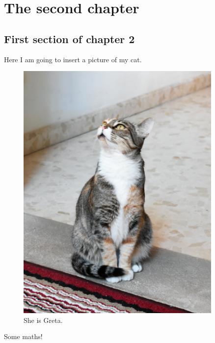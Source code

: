 \chapter{The second chapter}\label{chap2}
{
\hypersetup{linkcolor=\linkColor}
\minitoc
}
\newpage


\begin{refsegment}

\section{First section of chapter 2}\label{sec:chap2.sec1}

Here I am going to insert a picture of my cat.

\begin{figure}[H]
    \centering
    \includegraphics[width=0.9\textwidth]{./chapter_2/figures/Greta.jpg}
    \caption{She is Greta.}
    \label{fig:Greta}
\end{figure}

Some maths!


\end{refsegment}

